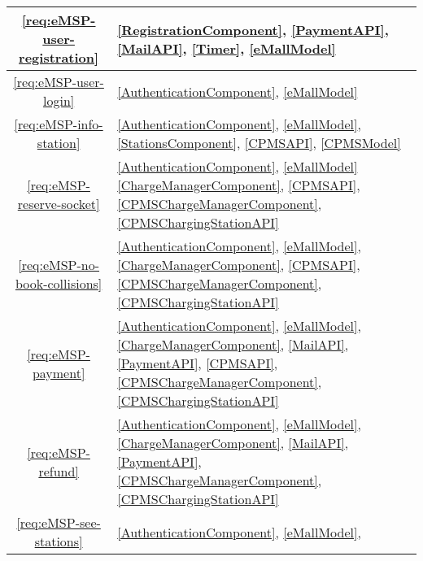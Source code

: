 \begin{table}[h]
    \begin{center}
        \begin{tabular}{|c||p{15.5cm}|}
            \hline
            \ref{req:eMSP-user-registration}     &
            \ref{RegistrationComponent},
            \ref{PaymentAPI},
            \ref{MailAPI},
            \ref{Timer},
            \ref{eMallModel}
            \\
            \hline
            \ref{req:eMSP-user-login}            &
            \ref{AuthenticationComponent},
            \ref{eMallModel}
            \\
            \hline
            \ref{req:eMSP-info-station}          &
            \ref{AuthenticationComponent},
            \ref{eMallModel},
            \ref{StationsComponent},
            \ref{CPMSAPI},
            \ref{CPMSModel}
            \\
            \hline
            \ref{req:eMSP-reserve-socket}        &
            \ref{AuthenticationComponent},
            \ref{eMallModel}
            \ref{ChargeManagerComponent},
            \ref{CPMSAPI},
            \ref{CPMSChargeManagerComponent},
            \ref{CPMSChargingStationAPI}
            \\
            \hline
            \ref{req:eMSP-no-book-collisions}    &
            \ref{AuthenticationComponent},
            \ref{eMallModel},
            \ref{ChargeManagerComponent},
            \ref{CPMSAPI},
            \ref{CPMSChargeManagerComponent},
            \ref{CPMSChargingStationAPI}
            \\
            \hline
            \ref{req:eMSP-payment}               &
            \ref{AuthenticationComponent},
            \ref{eMallModel},
            \ref{ChargeManagerComponent},
            \ref{MailAPI},
            \ref{PaymentAPI},
            \ref{CPMSAPI},
            \ref{CPMSChargeManagerComponent},
            \ref{CPMSChargingStationAPI}
            \\
            \hline
            \ref{req:eMSP-refund}                &
            \ref{AuthenticationComponent},
            \ref{eMallModel},
            \ref{ChargeManagerComponent},
            \ref{MailAPI},
            \ref{PaymentAPI},
            \ref{CPMSChargeManagerComponent},
            \ref{CPMSChargingStationAPI}
            \\
            \hline
            \ref{req:eMSP-see-stations}          &
            \ref{AuthenticationComponent},
            \ref{eMallModel},

\end{tabular}
\end{center}
\end{table}
